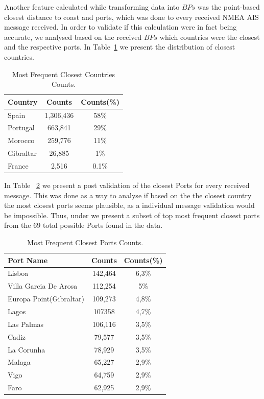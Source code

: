 Another feature calculated while transforming data into $BPs$ was the point-based closest distance to coast and ports, which was done to every received NMEA AIS message received. In order to validate if this calculation were in fact being accurate, we analysed based on the received $BPs$ which countries were the closest and the respective ports.
In Table~\ref{Table: 5 Closest Countries} we present the distribution of closest countries. 
\begin{table}[H]
\centering
\caption{Most Frequent Closest Countries Counts.}
\label{Table: 5 Closest Countries}
\begin{tabular}{@{}lcc@{}}
\toprule
Country & Counts & Counts(\%) \\ \midrule
Spain & 1,306,436 & 58\% \\
Portugal & 663,841 & 29\% \\
Morocco & 259,776 & 11\% \\
Gibraltar & 26,885 & 1\% \\
France & 2,516 & 0.1\% \\ \bottomrule
\end{tabular}
\end{table}
In Table ~\ref{Table: 5 Closest Ports} we present a post validation of the closest Ports for every received message. This was done as a way to analyse if based on the the closest country the most closest ports seems plausible, as a individual message validation would be impossible. Thus, under we present a subset of top most frequent closest ports from the $69$ total possible Ports found in the data.
\begin{table}[H]
\centering
\caption{Most Frequent Closest Ports Counts.}
\label{Table: 5 Closest Ports}
\begin{tabular}{@{}lcc@{}}
\toprule
Port Name & Counts & Counts(\%) \\ \midrule
Lisboa & 142,464 & 6,3\% \\
Villa Garcia De Arosa & 112,254 & 5\% \\
Europa Point(Gibraltar) & 109,273 & 4,8\% \\
Lagos & 107358 & 4,7\% \\
Las Palmas & 106,116 & 3,5\% \\
Cadiz & 79,577 & 3,5\% \\
La Corunha & 78,929 & 3,5\% \\
Malaga & 65,227 & 2,9\% \\
Vigo & 64,759 & 2,9\% \\
Faro & 62,925 & 2,9\% \\ \bottomrule
\end{tabular}
\end{table}

